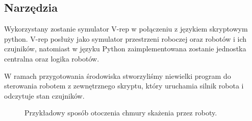 \documentclass[a4paper, 12pt]{article}
\begin{document}
		
	
	\subsection{Narzędzia}
	Wykorzystany zostanie symulator V-rep w połączeniu z językiem skryptowym python. V-rep posłuży jako symulator przestrzeni roboczej oraz robotów i ich czujników, natomiast w języku Python zaimplementowana zostanie jednostka centralna oraz logika robotów.
	
	W ramach przygotowania środowiska stworzyliśmy niewielki program do sterowania robotem z zewnętrznego skryptu, który uruchamia silnik robota i odczytuje stan czujników. 
	
	\begin{figure}[h!]
	\centering
	\caption{Przykładowy sposób otoczenia chmury skażenia przez roboty.}
	\end{figure}
		
	\clearpage
\end{document}
